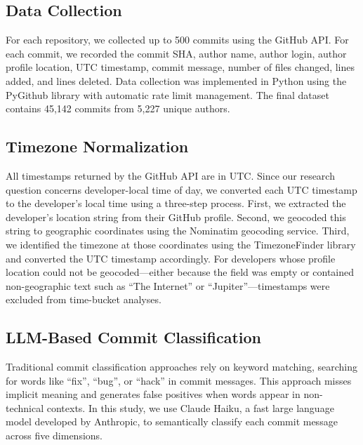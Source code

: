 \documentclass[sigconf]{acmart}
\begin{document}
\subsection{Data Collection}

For each repository, we collected up to 500 commits using the GitHub API. For each commit, we recorded the commit SHA, author name, author login, author profile location, UTC timestamp, commit message, number of files changed, lines added, and lines deleted. Data collection was implemented in Python using the PyGithub library with automatic rate limit management. The final dataset contains 45,142 commits from 5,227 unique authors.

\subsection{Timezone Normalization}

All timestamps returned by the GitHub API are in UTC. Since our research question concerns developer-local time of day, we converted each UTC timestamp to the developer's local time using a three-step process. First, we extracted the developer's location string from their GitHub profile. Second, we geocoded this string to geographic coordinates using the Nominatim geocoding service. Third, we identified the timezone at those coordinates using the TimezoneFinder library and converted the UTC timestamp accordingly. For developers whose profile location could not be geocoded---either because the field was empty or contained non-geographic text such as ``The Internet'' or ``Jupiter''---timestamps were excluded from time-bucket analyses.

\subsection{LLM-Based Commit Classification}

Traditional commit classification approaches rely on keyword matching, searching for words like ``fix'', ``bug'', or ``hack'' in commit messages. This approach misses implicit meaning and generates false positives when words appear in non-technical contexts. In this study, we use Claude Haiku, a fast large language model developed by Anthropic, to semantically classify each commit message across five dimensions.
\end{document}
